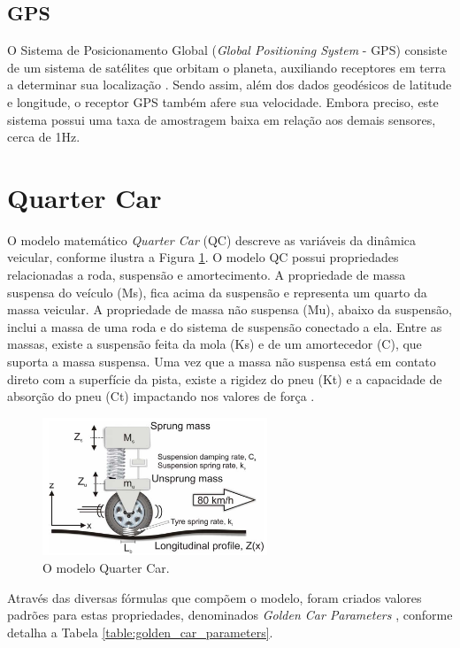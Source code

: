 \subsection{GPS}

O Sistema de Posicionamento Global (\textit{Global Positioning System} - GPS) consiste de um sistema de satélites que orbitam o planeta, auxiliando receptores em terra a determinar sua localização \cite{Milette2012}. Sendo assim, além dos dados geodésicos de latitude e longitude, o receptor GPS também afere sua velocidade. Embora preciso, este sistema possui uma taxa de amostragem baixa em relação aos demais sensores, cerca de 1Hz.

\section{Quarter Car}

O modelo matemático \textit{Quarter Car} (QC) descreve as variáveis da dinâmica veicular, conforme ilustra a Figura \ref{fig:quarter_car}. O modelo QC possui propriedades relacionadas a roda, suspensão e amortecimento. A propriedade de massa suspensa do veículo (Ms), fica acima da suspensão e representa um quarto da massa veicular. A propriedade de massa não suspensa (Mu), abaixo da suspensão, inclui a massa de uma roda e do sistema de suspensão conectado a ela. Entre as massas, existe a suspensão feita da mola (Ks) e de um amortecedor (C), que suporta a massa suspensa. Uma vez que a massa não suspensa está em contato direto com a superfície da pista, existe a rigidez do pneu (Kt) e a capacidade de absorção do pneu (Ct) impactando nos valores de força \cite{Yafeai2019}.

\begin{figure}[h!]
  \centering
  \caption{O modelo Quarter Car.}
   \label{fig:quarter_car}
   \includegraphics[width=0.6\textwidth]{figuras/fig2_2.png}
\end{figure}

Através das diversas fórmulas que compõem o modelo, foram criados valores padrões para estas propriedades, denominados \textit{Golden Car Parameters} \cite{Loizos2008}, conforme detalha a Tabela \ref{table:golden_car_parameters}.

